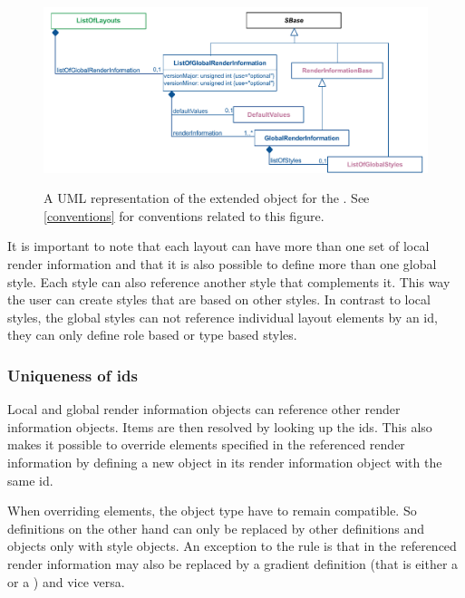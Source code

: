 \begin{figure}[!ht]
  \centering
  \includegraphics[width=\textwidth]{images/render-listoflayout-uml}\\
  \caption{A UML representation of the extended \ListOfLayouts object for the \RenderPackage.  See \ref{conventions} for conventions related to this figure. }
  \label{fig:lol_render_uml}
\end{figure}

It is important to note that each layout can have more than one 
set of local render information and that it is 
also possible to define more than one global style. Each style can also 
reference another style that complements it. This way the user can create 
styles that are based on other styles. In contrast to local styles, the global styles can not 
reference individual layout elements by an id, they can only define role based or 
type based styles.

\subsubsection{Uniqueness of ids}
\label{unique-id}

Local and global render information objects can reference other render 
information objects. Items are then resolved by looking up the ids. This also makes it possible to override elements specified in the referenced render information by 
defining a new object in its render information object with the same id. 

When overriding elements, the object type have to remain compatible. So 
\LineEnding definitions on the other hand can only be replaced by other 
\LineEnding definitions and \Style objects only with style objects. An exception 
to the rule is that \ColorDefinitions in the referenced render information may 
also be replaced by a gradient definition (that is either a \LinearGradient or 
a \RadialGradient) and vice versa. 

